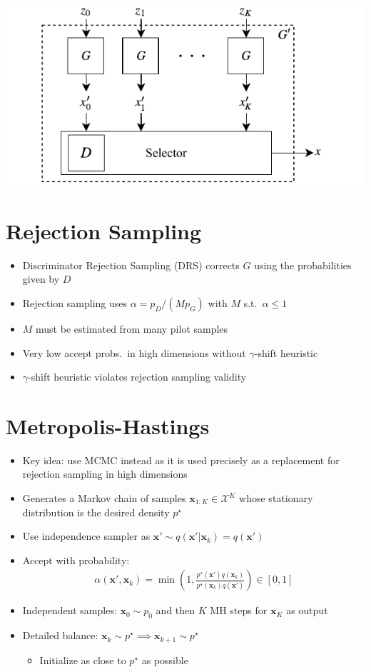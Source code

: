 \documentclass[a0,landscape]{a0poster}
\newcommand{\mysection}[1]{\section*{\fontsize{67.1}{82} \selectfont \color{NavyBlue} #1 \color{Black}}}
\renewcommand{\vec}[1]{{\boldsymbol{\mathbf{#1}}}} %
\newcommand{\set}[1]{\mathcal{#1}}
\newcommand{\sample}{\sim}
\newcommand{\given}{|}
\newcommand{\target}{{p^\star}}
\newcommand{\prop}{q}
\newcommand{\pinit}{{p_0}}
\newcommand{\accept}{\alpha}
\newcommand{\setx}{\set{X}}
\begin{document}
\begin{multicols}{3}
\hspace{7mm}
\includegraphics[scale=2.75]{../figures/block_diag.pdf}
\vspace{-2cm}

\mysection{Rejection Sampling}

\begin{itemize}
  \item Discriminator Rejection Sampling (DRS) corrects $G$ using the probabilities given by $D$
  \item Rejection sampling uses $\accept = p_D/(Mp_G)$ with $M$ s.t.~$\alpha \leq 1$
  \item $M$ must be estimated from many pilot samples \frownie{}
  \item Very low accept probs.~in high dimensions without $\gamma$-shift heuristic \frownie{}
  \item $\gamma$-shift heuristic violates rejection sampling validity \frownie{}
\end{itemize}

\columnbreak

\mysection{Metropolis-Hastings}

\begin{itemize}
  \item Key idea: use MCMC instead as it is used precisely as a replacement for rejection sampling in high dimensions
  \item Generates a Markov chain of samples $\vec x_{1:K} \in \setx^K$ whose stationary distribution is the desired density $\target$
  \item Use independence sampler as $\vec x' \sample \prop(\vec x' \given \vec x_k)=\prop(\vec x')$
  \item Accept with probability:
  \begin{align}
    \accept(\vec x', \vec x_k) = \min\left(1, \frac{\target(\vec x')\prop(\vec x_k)}{\target(\vec x_k)\prop(\vec x')}\right) \in [0,1]
  \end{align}
  \item Independent samples: $\vec x_0 \sample \pinit$ and then $K$ MH steps for $\vec x_K$ as output
  \item Detailed balance: $\vec x_k \sample \target \implies \vec x_{k+1} \sample \target$
  \begin{itemize}
    \item Initialize as close to $\target$ as possible
  \end{itemize}
\end{itemize}


\end{multicols}
\end{document}

